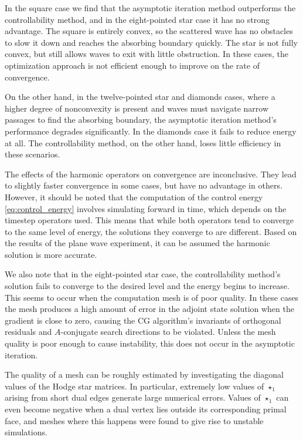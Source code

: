 \documentclass[utf8,english]{gradu3}
\begin{document}
In the square case we find that the asymptotic iteration method
outperforms the controllability method,
and in the eight-pointed star case it has no strong advantage.
The square is entirely convex, so the scattered wave has no obstacles to slow it down
and reaches the absorbing boundary quickly.
The star is not fully convex, but still allows waves to exit with little obstruction.
In these cases, the optimization approach is not efficient enough
to improve on the rate of convergence.

On the other hand, in the twelve-pointed star and diamonds cases,
where a higher degree of nonconvexity is present
and waves must navigate narrow passages to find the absorbing boundary,
the asymptotic iteration method's performance degrades significantly.
In the diamonds case it fails to reduce energy at all.
The controllability method, on the other hand,
loses little efficiency in these scenarios.

The effects of the harmonic operators on convergence are inconclusive.
They lead to slightly faster convergence in some cases,
but have no advantage in others.
However, it should be noted that the computation
of the control energy \eqref{eq:control_energy}
involves simulating forward in time, which depends on the timestep operators used.
This means that while both operators tend to converge to the same level of energy,
the solutions they converge to are different.
Based on the results of the plane wave experiment,
it can be assumed the harmonic solution is more accurate.

We also note that in the eight-pointed star case, the controllability method's solution
fails to converge to the desired level and the energy begins to increase.
This seems to occur when the computation mesh is of poor quality.
In these cases the mesh produces a high amount of error in the adjoint state solution
when the gradient is close to zero,
causing the CG algorithm's invariants of orthogonal residuals
and $A$-conjugate search directions to be violated.
Unless the mesh quality is poor enough to cause instability,
this does not occur in the asymptotic iteration.

The quality of a mesh can be roughly estimated by investigating
the diagonal values of the Hodge star matrices.
In particular, extremely low values of $\star_1$
arising from short dual edges generate large numerical errors.
Values of $\star_1$ can even become negative
when a dual vertex lies outside its corresponding primal face,
and meshes where this happens were found to give rise to unstable simulations.
\end{document}
